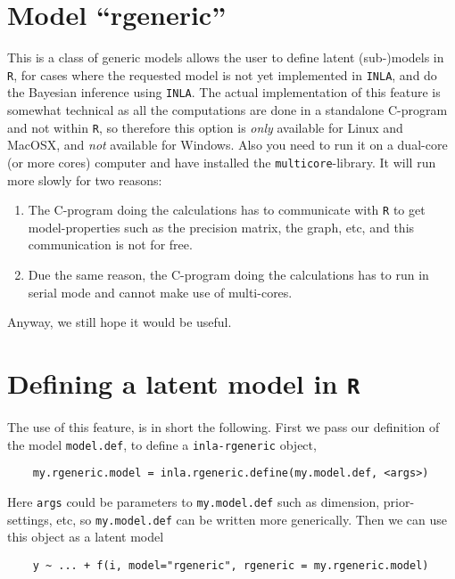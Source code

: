 \documentclass[a4paper,11pt]{article}
\begin{document}
\section*{Model ``rgeneric''}


This is a class of generic models allows the user to define latent
(sub-)models in \texttt{R}, for cases where the requested model is not
yet implemented in \texttt{INLA}, and do the Bayesian inference using
\texttt{INLA}. 
The actual implementation of this feature is somewhat technical as all
the computations are done in a standalone C-program and not within
\texttt{R}, so therefore this option is \emph{only} available for
Linux and MacOSX, and \emph{not} available for Windows. Also you need
to run it on a dual-core (or more cores) computer and have installed
the \texttt{multicore}-library. It will run more slowly for two
reasons:
\begin{enumerate}
\item The C-program doing the calculations has to communicate with
    \texttt{R} to get model-properties such as the precision matrix,
    the graph, etc, and this communication is not for free.
\item Due the same reason, the C-program doing the calculations has to
    run in serial mode and cannot make use of multi-cores.
\end{enumerate}
Anyway, we still hope it would be useful.

\section*{Defining a latent model in \texttt{R}}

The use of this feature, is in short the following. First we pass our
definition of the model \texttt{model.def}, to define a
\texttt{inla-rgeneric} object,
\begin{verbatim}
    my.rgeneric.model = inla.rgeneric.define(my.model.def, <args>)
\end{verbatim}
Here \texttt{args} could be parameters to \texttt{my.model.def}
such as dimension, prior-settings, etc, so \texttt{my.model.def} can
be written more generically.  Then we can use this object as a latent
model
\begin{verbatim}
    y ~ ... + f(i, model="rgeneric", rgeneric = my.rgeneric.model)
\end{verbatim}
\end{document}
